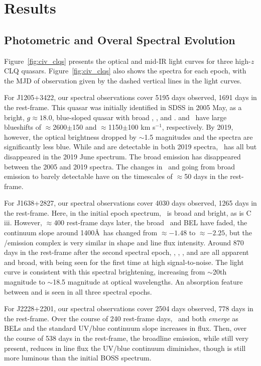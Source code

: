 \documentclass[fleqn,usenatbib]{mnras}
\begin{document}
\section{Results}
\subsection{Photometric and Overal Spectral Evolution}
Figure~\ref{fig:civ_clqs} presents the optical and mid-IR light
curves for three high-$z$ CLQ quasars.  Figure~\ref{fig:civ_clqs} also
shows the spectra for each epoch, with the MJD of observation given by
the dashed vertical lines in the light curves.

For J1205+3422, our spectral observations cover 5195 days observed,
1691 days in the rest-frame. This quasar was initially identified in
SDSS in 2005 May, as a bright, $g\approx18.0$, blue-sloped quasar with
broad \siiv, \civ, \ciii and \mgii. \ciii and \civ\ have large
blueshifts of $\approx$2600$\pm$150 and $\approx$1150$\pm$100 km
s$^{-1}$, respectively.  By 2019, however, the optical brightness
dropped by $\sim$1.5 magnitudes and the spectra are significantly less
blue.  While \lya and \nv are detectable in both 2019 spectra, \civ\
has all but disappeared in the 2019 June spectrum.  The broad \ciii
emission has disappeared between the 2005 and 2019 spectra. The
changes in \civ\ and \ciii going from broad emission to barely
detectable have on the timescales of $\approx$50 days in the
rest-frame.

For J1638+2827, our spectral observations cover 4030 days observed,
1265 days in the rest-frame. Here, in the initial epoch spectrum,
\civ\ is broad and bright, as is C\,{\sc iii}. However, $\approx$400
rest-frame days later, the broad \civ\ and \ciii BEL have faded, the
continuum slope around 1400\AA\ has changed from $\approx-1.48$ to
$\approx-2.25$, but the \lya/\nv emission complex is very similar in
shape and line flux intensity. Around 870 days in the rest-frame after
the second spectral epoch, \lya, \nv, \civ, \ciii and \mgii are all
apparent and broad, with \mgii being seen for the first time at high
signal-to-noise. The light curve is consistent with this spectral
brightening, increasing from $\sim$20th magnitude to $\sim$18.5
magnitude at optical wavelengths. An absorption feature between \lya
and \nv is seen in all three spectral epochs.

For J2228+2201, our spectral observations cover 2504 days observed,
778 days in the rest-frame. Over the course of 240 rest-frame days,
\civ\ and \ciii both {\it emerge} as BELs and the standard UV/blue
continuum slope increases in flux.  Then, over the course of 538 days
in the rest-frame, the broadline emission, while still very present,
reduces in line flux the UV/blue continuum diminishes, though is still
more luminous than the initial BOSS spectrum.
\end{document}
